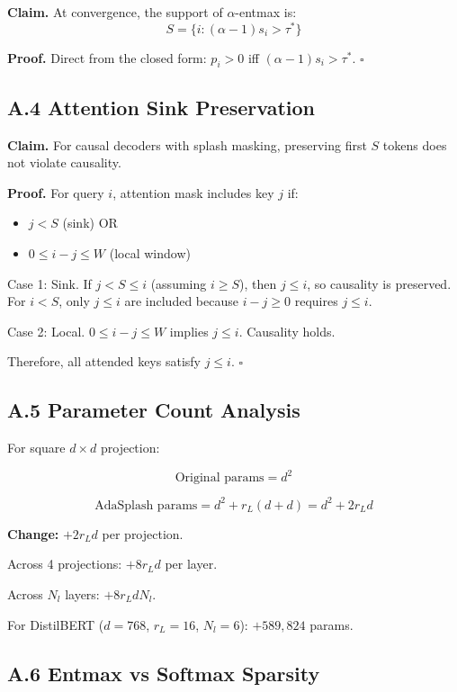 \textbf{Claim.} At convergence, the support of $\alpha$-entmax is:
\[
S = \{i : (\alpha - 1) s_i > \tau^*\}
\]

\textbf{Proof.} Direct from the closed form: $p_i > 0$ iff $(\alpha - 1) s_i > \tau^*$. $\square$

\subsection{A.4 Attention Sink Preservation}

\textbf{Claim.} For causal decoders with splash masking, preserving first $S$ 
tokens does not violate causality.

\textbf{Proof.} For query $i$, attention mask includes key $j$ if:
\begin{itemize}
\item $j < S$ (sink) OR
\item $0 \leq i - j \leq W$ (local window)

\end{itemize}
Case 1: Sink. If $j < S \leq i$ (assuming $i \geq S$), then $j \leq i$, 
so causality is preserved. For $i < S$, only $j \leq i$ are included 
because $i - j \geq 0$ requires $j \leq i$.

Case 2: Local. $0 \leq i - j \leq W$ implies $j \leq i$. Causality holds.

Therefore, all attended keys satisfy $j \leq i$. $\square$

\subsection{A.5 Parameter Count Analysis}

For square $d \times d$ projection:

\[
\text{Original params} = d^2
\tag{A.6}
\]

\[
\text{AdaSplash params} = d^2 + r_L (d + d) = d^2 + 2 r_L d
\tag{A.7}
\]

\textbf{Change:} $+2 r_L d$ per projection.

Across 4 projections: $+8 r_L d$ per layer.

Across $N_l$ layers: $+8 r_L d N_l$.

For DistilBERT ($d = 768$, $r_L = 16$, $N_l = 6$): $+589{,}824$ params.

\subsection{A.6 Entmax vs Softmax Sparsity}

